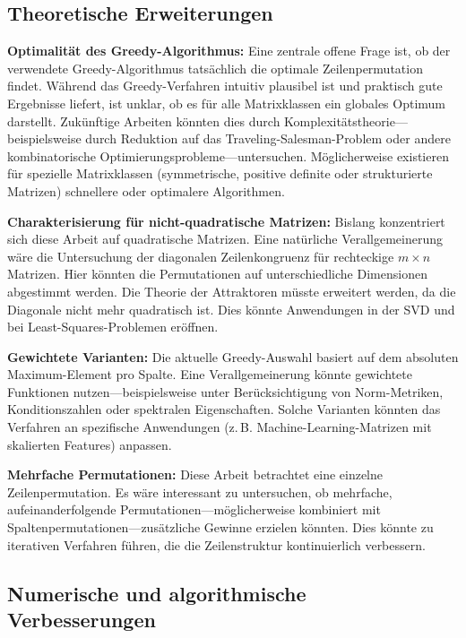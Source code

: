 \documentclass[a4paper,12pt]{article}
\theoremstyle{definition}
\begin{document}
\subsection*{Theoretische Erweiterungen}

\textbf{Optimalität des Greedy-Algorithmus:} Eine zentrale offene Frage ist, ob der verwendete Greedy-Algorithmus tatsächlich die optimale Zeilenpermutation findet. Während das Greedy-Verfahren intuitiv plausibel ist und praktisch gute Ergebnisse liefert, ist unklar, ob es für alle Matrixklassen ein globales Optimum darstellt. Zukünftige Arbeiten könnten dies durch Komplexitätstheorie—beispielsweise durch Reduktion auf das Traveling-Salesman-Problem oder andere kombinatorische Optimierungsprobleme—untersuchen. Möglicherweise existieren für spezielle Matrixklassen (symmetrische, positive definite oder strukturierte Matrizen) schnellere oder optimalere Algorithmen.

\textbf{Charakterisierung für nicht-quadratische Matrizen:} Bislang konzentriert sich diese Arbeit auf quadratische Matrizen. Eine natürliche Verallgemeinerung wäre die Untersuchung der diagonalen Zeilenkongruenz für rechteckige $m \times n$ Matrizen. Hier könnten die Permutationen auf unterschiedliche Dimensionen abgestimmt werden. Die Theorie der Attraktoren müsste erweitert werden, da die Diagonale nicht mehr quadratisch ist. Dies könnte Anwendungen in der SVD und bei Least-Squares-Problemen eröffnen.

\textbf{Gewichtete Varianten:} Die aktuelle Greedy-Auswahl basiert auf dem absoluten Maximum-Element pro Spalte. Eine Verallgemeinerung könnte gewichtete Funktionen nutzen—beispielsweise unter Berücksichtigung von Norm-Metriken, Konditionszahlen oder spektralen Eigenschaften. Solche Varianten könnten das Verfahren an spezifische Anwendungen (z.\,B. Machine-Learning-Matrizen mit skalierten Features) anpassen.

\textbf{Mehrfache Permutationen:} Diese Arbeit betrachtet eine einzelne Zeilenpermutation. Es wäre interessant zu untersuchen, ob mehrfache, aufeinanderfolgende Permutationen—möglicherweise kombiniert mit Spaltenpermutationen—zusätzliche Gewinne erzielen könnten. Dies könnte zu iterativen Verfahren führen, die die Zeilenstruktur kontinuierlich verbessern.

\subsection*{Numerische und algorithmische Verbesserungen}
\end{document}
